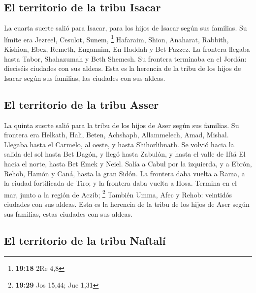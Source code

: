 \begin{paracol}{2}
\hypertarget{el-territorio-de-la-tribu-isacar}{%
\subsection{El territorio de la tribu
Isacar}\label{el-territorio-de-la-tribu-isacar}}

 La cuarta suerte salió para Isacar, para los hijos de
Isacar según sus familias.  Su límite era Jezreel,
Cesulot, Sunem, \footnote{\textbf{19:18} 2Re 4,8} 
Hafaraim, Shion, Anaharat,  Rabbith, Kishion, Ebez,
 Remeth, Engannim, En Haddah y Bet Pazzez.
 La frontera llegaba hasta Tabor, Shahazumah y Beth
Shemesh. Su frontera terminaba en el Jordán: dieciséis ciudades con sus
aldeas.  Esta es la herencia de la tribu de los hijos de
Isacar según sus familias, las ciudades con sus aldeas.

\hypertarget{el-territorio-de-la-tribu-asser}{%
\subsection{El territorio de la tribu
Asser}\label{el-territorio-de-la-tribu-asser}}

 La quinta suerte salió para la tribu de los hijos de
Aser según sus familias.  Su frontera era Helkath, Hali,
Beten, Achshaph,  Allammelech, Amad, Mishal. Llegaba
hasta el Carmelo, al oeste, y hasta Shihorlibnath.  Se
volvió hacia la salida del sol hasta Bet Dagón, y llegó hasta Zabulón, y
hasta el valle de Iftá El hacia el norte, hasta Bet Emek y Neiel. Salía
a Cabul por la izquierda,  y a Ebrón, Rehob, Hamón y
Caná, hasta la gran Sidón.  La frontera daba vuelta a
Rama, a la ciudad fortificada de Tiro; y la frontera daba vuelta a Hosa.
Termina en el mar, junto a la región de Aczib; \footnote{\textbf{19:29}
  Jos 15,44; Jue 1,31}  También Umma, Afec y Rehob:
veintidós ciudades con sus aldeas.  Esta es la herencia
de la tribu de los hijos de Aser según sus familias, estas ciudades con
sus aldeas.

\hypertarget{el-territorio-de-la-tribu-naftaluxed}{%
\subsection{El territorio de la tribu
Naftalí}\label{el-territorio-de-la-tribu-naftaluxed}}


\end{paracol}
